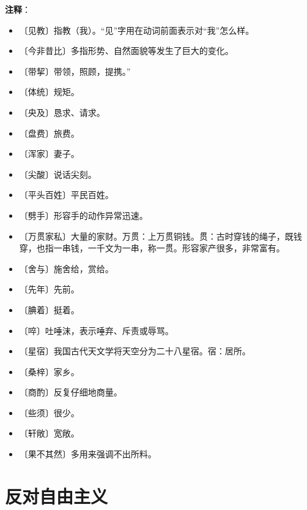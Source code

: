 \documentclass[12pt,UTF-8,openany]{ctexbook}
\begin{document}
\newpage

\textbf{注释}：

\vspace{-1em}

\begin{itemize}
    \setlength\itemsep{-0.2em}
    \item 〔见教〕指教（我）。“见”字用在动词前面表示对“我”怎么样。
    \item 〔今非昔比〕多指形势、自然面貌等发生了巨大的变化。
    \item 〔带挈〕带领，照顾，提携。”
    \item 〔体统〕规矩。
    \item 〔央及〕恳求、请求。
    \item 〔盘费〕旅费。
    \item 〔浑家〕妻子。
    \item 〔尖酸〕说话尖刻。
    \item 〔平头百姓〕平民百姓。
    \item 〔劈手〕形容手的动作异常迅速。
    \item 〔万贯家私〕大量的家财。万贯：上万贯铜钱。贯：古时穿钱的绳子，既钱穿，也指一串钱，一千文为一串，称一贯。形容家产很多，非常富有。
    \item 〔舍与〕施舍给，赏给。
    \item 〔先年〕先前。
    \item 〔腆着〕挺着。
    \item 〔啐〕吐唾沫，表示唾弃、斥责或辱骂。
    \item 〔星宿〕我国古代天文学将天空分为二十八星宿。宿：居所。
    \item 〔桑梓〕家乡。
    \item 〔商酌〕反复仔细地商量。
    \item 〔些须〕很少。
    \item 〔轩敞〕宽敞。
    \item 〔果不其然〕多用来强调不出所料。
\end{itemize}

\chapter{反对自由主义}
\end{document}
